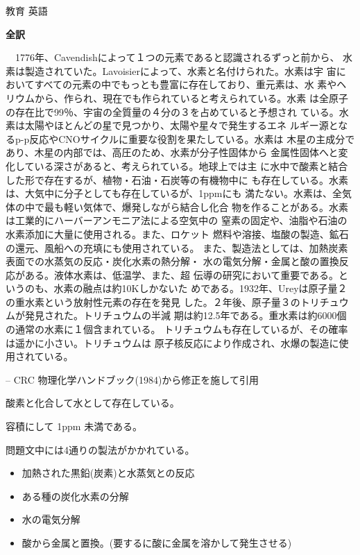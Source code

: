 \documentclass[fleqn]{jbook}
\begin{document}
\begin{answer}{教育 英語}{}
\begin{subanswers}
\SubAnswer 


{\bf 全訳} 

 　1776年、Cavendishによって１つの元素であると認識されるずっと前から、
 水素は製造されていた。Lavoisierによって、水素と名付けられた。水素は宇
 宙においてすべての元素の中でもっとも豊富に存在しており、重元素は、水
 素やヘリウムから、作られ、現在でも作られていると考えられている。水素
 は全原子の存在比で99％、宇宙の全質量の４分の３を占めていると予想され
 ている。水素は太陽やほとんどの星で見つかり、太陽や星々で発生するエネ
 ルギー源となるp-p反応やCNOサイクルに重要な役割を果たしている。水素は
 木星の主成分であり、木星の内部では、高圧のため、水素が分子性固体から
 金属性固体へと変化している深さがあると、考えられている。地球上では主
 に水中で酸素と結合した形で存在するが、植物・石油・石炭等の有機物中に
 も存在している。水素は、大気中に分子としても存在しているが、1ppmにも
 満たない。水素は、全気体の中で最も軽い気体で、爆発しながら結合し化合
 物を作ることがある。水素は工業的にハーバーアンモニア法による空気中の
 窒素の固定や、油脂や石油の水素添加に大量に使用される。また、ロケット
 燃料や溶接、塩酸の製造、鉱石の還元、風船への充填にも使用されている。
 また、製造法としては、加熱炭素表面での水蒸気の反応・炭化水素の熱分解・
 水の電気分解・金属と酸の置換反応がある。液体水素は、低温学、また、超
 伝導の研究において重要である。というのも、水素の融点は約10Kしかないた
 めである。1932年、Ureyは原子量２の重水素という放射性元素の存在を発見
 した。２年後、原子量３のトリチュウムが発見された。トリチュウムの半減
 期は約12.5年である。重水素は約6000個の通常の水素に１個含まれている。
 トリチュウムも存在しているが、その確率は遥かに小さい。トリチュウムは
 原子核反応により作成され、水爆の製造に使用されている。

%
  \begin{flushright}
  -- CRC 物理化学ハンドブック(1984)から修正を施して引用
  \end{flushright}
%

 
\begin{subsubanswers} 

 \SubSubAnswer
  酸素と化合して水として存在している。

 \SubSubAnswer
 容積にして 1ppm 未満である。

 \SubSubAnswer
 問題文中には4通りの製法がかかれている。

 \begin{itemize} 
   \item 加熱された黒鉛(炭素)と水蒸気との反応
   \item ある種の炭化水素の分解
   \item 水の電気分解
    \item 酸から金属と置換。(要するに酸に金属を溶かして発生させる) 
 \end{itemize}


\end{subsubanswers}
\end{subanswers}
\end{answer}
\end{document}
